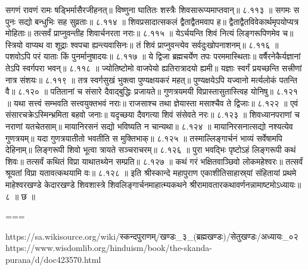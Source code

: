 सगणं रावणं रामः षड्भिर्मासैरजीहनत्॥
विष्णुना घातितः शस्त्रैः शिवसारूप्यमाप्तवान्॥ ८.११३ ॥
सगमः स पुनः सद्यो बन्धुभिः सह सुव्रताः॥ ८.११४ ॥
शिवप्रसादात्सकलं द्वैताद्वैतमवाप ह॥
द्वैताद्वैतविवेकार्थमृपयोप्यत्र मोहिताः॥
तत्सर्वं प्राप्नुवन्तीह शिवार्चनरता नराः॥ ८.११५ ॥
येऽर्चयन्ति शिवं नित्यं लिङ्गरूपिणमेव च॥
स्त्रियो वाप्यथ वा शूद्राः श्वपचा ह्यन्त्यवासिनः॥
तं शिवं प्राप्नुवन्त्येव सर्वदुःखोपनाशनम्॥ ८.११६ ॥
पशवोऽपि परं याताः किं पुनर्मानुषादयः॥ ८.११७ ॥
ये द्विजा ब्रह्मचर्येण तपः परममास्थिताः॥
वर्षैरनेकैर्यज्ञानां तेऽपि स्वर्गपरा भवन्॥ ८.११८ ॥
ज्योतिष्टोमो वाजपेयो ह्यतिरात्रादयो ह्यमी॥
यज्ञाः स्वर्गं प्रयच्छन्ति सत्त्रीणां नात्र संशयः॥ ८.११९ ॥
तत्र स्वर्गसुखं भुक्त्वा पुण्यक्षयकरं महत्॥
पुण्यक्षयेऽपि यज्वानो मर्त्यलोकं पतन्ति वै॥ ८.१२० ॥
पतितानां च संसारे दैवाद्बुद्धिः प्रजायते॥
गुणत्रयमयी विप्रास्तासुतास्त्विह योनिषु॥ ८.१२१ ॥
यथा सत्त्वं सम्भवति सत्त्वयुक्तभवं नराः॥
राजसाश्च तथा ज्ञेयास्ता मसाश्चैव ते द्विजाः॥ ८.१२२ ॥
एवं संसारचक्रेऽस्मिन्भ्रमिता बहवो जनाः॥
यदृच्छया दैवगत्या शिवं संसेवते नरः॥ ८.१२३ ॥
शिवध्यानपराणां च नराणां यतचेतसाम्॥
मायानिरसनं सद्यो भविष्यति न चान्यथा॥ ८.१२४ ॥
मायानिरसनात्सद्यो नश्यत्येव गुणत्रयम्॥
यदा गुणत्रयातीतो भवतीति स मुक्तिभाक्॥ ८.१२५ ॥
तस्माल्लिङ्गार्चनं भाव्यं सर्वेषामपि देहिनाम्॥
लिङ्गरूपी शिवो भूत्वा त्रायते सञ्चराचरम्॥ ८.१२६ ॥
पुरा भवद्भिः पृष्टोऽहं लिङ्गरूपी कथं शिवः॥
तत्सर्वं कथितं विप्रा याथातथ्येन सम्प्रति॥ ८.१२७ ॥
कथं गरं भक्षितवाञ्छिवो लोकमहेश्वरः॥
तत्सर्वं श्रूयतां विप्रा यतावत्कथयामि वः॥ ८.१२८ ॥
इति श्रीस्कान्दे महापुराण एकाशीतिसाहास्र्यां संहितायां प्रथमे माहेश्वरखण्डे केदारखण्डे शिवशास्त्रे शिवलिङ्गार्चनमाहात्म्यकथने श्रीरामावतारकथावर्णनन्नामाष्टमोऽध्यायः॥ ८ ॥ छ ॥


===

https://sa.wikisource.org/wiki/स्कन्दपुराणम्/खण्डः_३_(ब्रह्मखण्डः)/सेतुखण्डः/अध्यायः_०२
https://www.wisdomlib.org/hinduism/book/the-skanda-purana/d/doc423570.html

